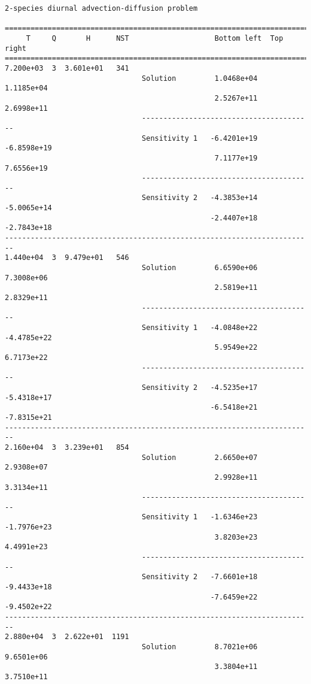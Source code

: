 \begin{verbatim}
2-species diurnal advection-diffusion problem

========================================================================
     T     Q       H      NST                    Bottom left  Top right 
========================================================================
7.200e+03  3  3.601e+01   341
                                Solution         1.0468e+04   1.1185e+04 
                                                 2.5267e+11   2.6998e+11 
                                ----------------------------------------
                                Sensitivity 1   -6.4201e+19  -6.8598e+19 
                                                 7.1177e+19   7.6556e+19 
                                ----------------------------------------
                                Sensitivity 2   -4.3853e+14  -5.0065e+14 
                                                -2.4407e+18  -2.7843e+18 
------------------------------------------------------------------------
1.440e+04  3  9.479e+01   546
                                Solution         6.6590e+06   7.3008e+06 
                                                 2.5819e+11   2.8329e+11 
                                ----------------------------------------
                                Sensitivity 1   -4.0848e+22  -4.4785e+22 
                                                 5.9549e+22   6.7173e+22 
                                ----------------------------------------
                                Sensitivity 2   -4.5235e+17  -5.4318e+17 
                                                -6.5418e+21  -7.8315e+21 
------------------------------------------------------------------------
2.160e+04  3  3.239e+01   854
                                Solution         2.6650e+07   2.9308e+07 
                                                 2.9928e+11   3.3134e+11 
                                ----------------------------------------
                                Sensitivity 1   -1.6346e+23  -1.7976e+23 
                                                 3.8203e+23   4.4991e+23 
                                ----------------------------------------
                                Sensitivity 2   -7.6601e+18  -9.4433e+18 
                                                -7.6459e+22  -9.4502e+22 
------------------------------------------------------------------------
2.880e+04  3  2.622e+01  1191
                                Solution         8.7021e+06   9.6501e+06 
                                                 3.3804e+11   3.7510e+11 

\end{verbatim}

